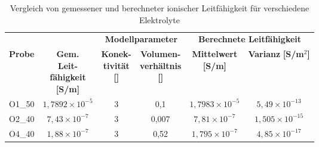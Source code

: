\begin{table}[htbp]
    \label{tab:pore_network_result}
    \centering
    \caption{Vergleich von gemessener und berechneter ionischer Leitfähigkeit für verschiedene Elektrolyte}
    \renewcommand{\arraystretch}{1.3}
    \begin{tabular}{l|c|cc|cc}
    \toprule
     & & \multicolumn{2}{|c|}{\textbf{Modellparameter}} & \multicolumn{2}{c}{\textbf{Berechnete Leitfähigkeit}} \\
     \textbf{Probe} 
     & \makecell{\textbf{Gem.}\\\textbf{Leit-}\\\textbf{fähigkeit}\\\textbf{[S/m]}} 
     & \makecell{\textbf{Konek-}\\\textbf{tivität}\\\textbf{[\;]}}
     & \makecell{\textbf{Volumen-}\\\textbf{verhältnis}\\\textbf{[\;]}} 
     & \makecell{\textbf{Mittelwert}\\\textbf{[S/m]}} 
     & \makecell{\textbf{Varianz}\\\textbf{[S/m$^2$]}}
     \\
    \midrule
    O1\_50 & $1,7892 \times 10^{-5}$ & 3 & 0,1   & $1,7983 \times 10^{-5}$ & $5,49 \times 10^{-13}$ \\
    O2\_40 & $7,43 \times 10^{-7}$  & 3 & 0,007 & $7,81 \times 10^{-7}$  & $1,505 \times 10^{-15}$ \\
    O4\_40 & $1,88 \times 10^{-7}$  & 3 & 0,52  & $1,795 \times 10^{-7}$ & $4,85 \times 10^{-17}$ \\
    \bottomrule
    \end{tabular}
\end{table}
    